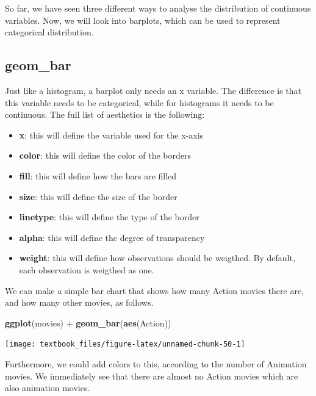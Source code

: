 \documentclass[]{tufte-book}
\newenvironment{Shaded}{}{}
\newcommand{\KeywordTok}[1]{\textcolor[rgb]{0.00,0.44,0.13}{\textbf{#1}}}
\newcommand{\NormalTok}[1]{#1}
\newcommand{\OperatorTok}[1]{\textcolor[rgb]{0.40,0.40,0.40}{#1}}
\newcommand{\StringTok}[1]{\textcolor[rgb]{0.25,0.44,0.63}{#1}}
\providecommand{\tightlist}{%
  \setlength{\itemsep}{0pt}\setlength{\parskip}{0pt}}
\begin{document}
So far, we have seen three different ways to analyse the distribution of continuous variables. Now, we will look into barplots, which can be used to represent categorical distribution.

\hypertarget{geom_bar}{%
\subsection{geom\_bar}\label{geom_bar}}

Just like a histogram, a barplot only needs an x variable. The difference is that this variable needs to be categorical, while for histograms it needs to be continuous. The full list of aesthetics is the following:

\begin{itemize}
\tightlist
\item
  \textbf{x}: this will define the variable used for the x-axis
\item
  \textbf{color}: this will define the color of the borders
\item
  \textbf{fill}: this will define how the bars are filled
\item
  \textbf{size}: this will define the size of the border
\item
  \textbf{linetype}: this will define the type of the border
\item
  \textbf{alpha}: this will define the degree of transparency
\item
  \textbf{weight}: this will define how observations should be weigthed. By default, each observation is weigthed as one.
\end{itemize}

We can make a simple bar chart that shows how many Action movies there are, and how many other movies, as follows.

\begin{Shaded}
\begin{Highlighting}[]
\KeywordTok{ggplot}\NormalTok{(movies) }\OperatorTok{+}
\StringTok{    }\KeywordTok{geom_bar}\NormalTok{(}\KeywordTok{aes}\NormalTok{(Action))}
\end{Highlighting}
\end{Shaded}

\texttt{[image: textbook\_files/figure-latex/unnamed-chunk-50-1]}

Furthermore, we could add colors to this, according to the number of Animation movies. We immediately see that there are almost no Action movies which are also animation movies.
\end{document}
